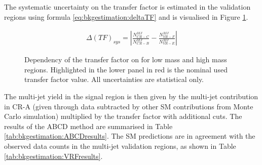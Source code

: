 The systematic uncertainty on the transfer factor is estimated in the validation regions using formula \eqref{eq:bkgestimation:deltaTF} and is visualised in Figure \ref{fig:bkgestimation:ABCD:TF}.

\begin{align}
\Delta(TF)_{sys} =  | \frac{N^{MJ}_{CR-C}}{N^{MJ}_{CR-B}} - \frac{N^{MJ}_{VR-F}}{N^{MJ}_{VR-E}} | \label{eq:bkgestimation:deltaTF}
\end{align}

\begin{figure}[!htpb]
  \centering
\caption{Dependency of the transfer factor on \Summt for low mass and high mass regions. Highlighted in the lower panel in red is the nominal used transfer factor value. All uncertainties are statistical only. \label{fig:bkgestimation:ABCD:TF}}
\end{figure}

The multi-jet yield in the signal region is then given by the multi-jet contribution in CR-A (given through data subtracted by other \ac{SM} contributions from Monte Carlo simulation) multiplied by the transfer factor with additional cuts.
The results of the ABCD method are summarised in Table
\ref{tab:bkgestimation:ABCDresults}. The SM predictions are in agreement with
the observed data counts in the multi-jet validation regions, as shown in Table \ref{tab:bkgestimation:VRFresults}.

